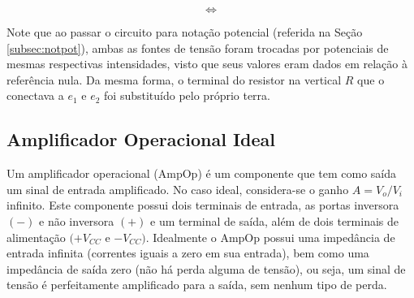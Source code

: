 \documentclass{article}
\numberwithin{equation}{section}
\newlength\Colsep
\begin{document}
\begin{center}
\noindent\begin{minipage}{\textwidth}
\begin{minipage}[c][5cm][c]{\dimexpr0.45\textwidth-0.5\Colsep\relax}
    \begin{center}
\end{center}
\end{minipage} \hfill
\begin{minipage}[c][5cm][c]{\dimexpr0.1\textwidth-0.5\Colsep\relax}
    $$\iff$$
\end{minipage} \hfill
\begin{minipage}[c][5cm][c]{\dimexpr0.45\textwidth-0.5\Colsep\relax}
    \begin{center}
\end{center}
\end{minipage}
\end{minipage}
\end{center}

Note que ao passar o circuito para notação potencial (referida na Seção \ref{subsec:notpot}), ambas as fontes de tensão foram trocadas por potenciais de mesmas respectivas intensidades, visto que seus valores eram dados em relação à referência nula. Da mesma forma, o terminal do resistor na vertical $R$ que o conectava a $e_1$ e $e_2$ foi substituído pelo próprio terra.

\subsection{Amplificador Operacional Ideal}
\label{subsec:ampop}
Um amplificador operacional (AmpOp) é um componente que tem como saída um sinal de entrada amplificado. No caso ideal, considera-se o ganho $A=V_o/V_i$ infinito. Este componente possui dois terminais de entrada, as portas inversora $(-)$ e não inversora $(+)$ e um terminal de saída, além de dois terminais de alimentação $(+V_{CC}$ e $-V_{CC})$. Idealmente o AmpOp possui uma impedância de entrada infinita (correntes iguais a zero em sua entrada), bem como uma impedância de saída zero (não há perda alguma de tensão), ou seja, um sinal de tensão é perfeitamente amplificado para a saída, sem nenhum tipo de perda.
\end{document}
